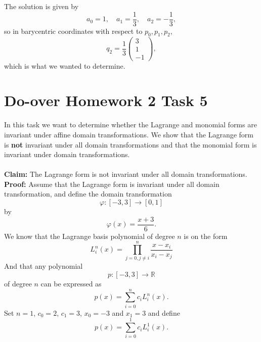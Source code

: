 \documentclass[]{article}
\begin{document}
The solution is given by \begin{equation*}
a_0 = 1, \quad a_1 = \frac{1}{3}, \quad a_2 = -\frac{1}{3},
\end{equation*}
so in barycentric coordinates with respect to $p_0, p_1, p_2$, \begin{equation*}
q_2 = \frac{1}{3}\left(\begin{array}{r}
3\\
1\\
-1
\end{array}\right),
\end{equation*}
which is what we wanted to determine.

\section*{Do-over Homework 2 Task 5}
In this task we want to determine whether the Lagrange and monomial forms are invariant under affine 	domain transformations. We show that the Lagrange form is \textbf{not} invariant under all domain transformations and that the monomial form is invariant under domain transformations.\\
\\
\textbf{Claim:} The Lagrange form is not invariant under all domain transformations.\\
\textbf{Proof:} Assume that the Lagrange form is invariant under all domain transformation, and define the domain transformation \begin{equation*}
\varphi: [-3, 3] \rightarrow [0, 1]
\end{equation*}
by
\begin{equation*}
\varphi(x) = \frac{x + 3}{6}.
\end{equation*}
We know that the Lagrange basis polynomial of degree $n$ is on the form\begin{equation*}
L_i^n(x) = \prod_{j=0, j\neq i}^{n}\frac{x-x_i}{x_i - x_j}
\end{equation*}
And that any polynomial \begin{equation*}
p:[-3, 3]\rightarrow \mathbb{R}
\end{equation*}
of degree $n$ can be expressed as \begin{equation*}
p(x)=\sum_{i = 0}^{n} c_iL_i^n(x).
\end{equation*}
Set $n=1$, $c_0 = 2$, $c_1 = 3$, $x_0=-3$ and $x_1 = 3$ and define \begin{equation*}
p(x)=\sum_{i = 0}^{1} c_iL_i^1(x).
\end{equation*}
\end{document}
